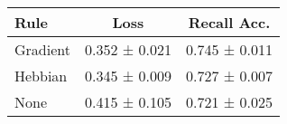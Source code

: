 \begin{tabular}{lcc}
\toprule
Rule & Loss & Recall Acc. \\
\midrule
Gradient & 0.352 ± 0.021 & 0.745 ± 0.011 \\
Hebbian & 0.345 ± 0.009 & 0.727 ± 0.007 \\
None & 0.415 ± 0.105 & 0.721 ± 0.025 \\
\bottomrule
\end{tabular}
